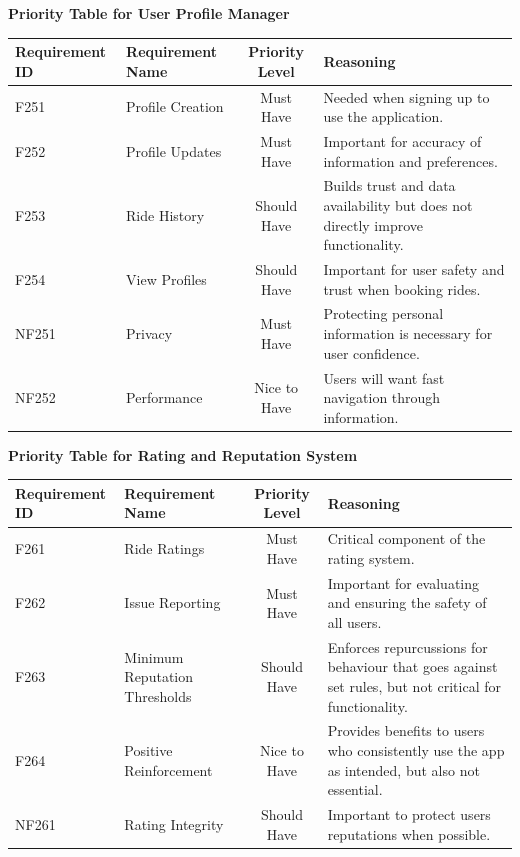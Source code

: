 \documentclass[12pt,letterpaper]{article}
\begin{document}
  \noindent \textbf{Priority Table for User Profile Manager}
  \vspace{0.5em}
  \begin{center}
  \small
  \begin{tabularx}{\textwidth}{|l|X|c|Y|}
  \hline
  \textbf{Requirement ID} & \textbf{Requirement Name} & \textbf{Priority Level} & \textbf{Reasoning} \\ \hline
  F251 & Profile Creation & Must Have & Needed when signing up to use the application. \\ \hline
  F252 & Profile Updates & Must Have & Important for accuracy of information and preferences. \\ \hline
  F253 & Ride History & Should Have & Builds trust and data availability but does not directly improve functionality. \\ \hline
  F254 & View Profiles & Should Have & Important for user safety and trust when booking rides. \\ \hline
  NF251 & Privacy & Must Have & Protecting personal information is necessary for user confidence. \\ \hline
  NF252 & Performance & Nice to Have & Users will want fast navigation through information. \\ \hline
  \end{tabularx}
\end{center}
  \vspace{2em}

  \noindent \textbf{Priority Table for Rating and Reputation System}
  \vspace{0.5em}
  \begin{center}
  \small
  \begin{tabularx}{\textwidth}{|l|X|c|Y|}
  \hline
  \textbf{Requirement ID} & \textbf{Requirement Name} & \textbf{Priority Level} & \textbf{Reasoning} \\ \hline
  F261 & Ride Ratings & Must Have & Critical component of the rating system. \\ \hline
  F262 & Issue Reporting & Must Have & Important for evaluating and ensuring the safety of all users. \\ \hline
  F263 & Minimum Reputation Thresholds & Should Have & Enforces repurcussions for behaviour that goes against set rules, but not critical for functionality. \\ \hline
  F264 & Positive Reinforcement & Nice to Have & Provides benefits to users who consistently use the app as intended, but also not essential. \\ \hline
  NF261 & Rating Integrity & Should Have & Important to protect users reputations when possible. \\ \hline
  \end{tabularx}
\end{center}
\vspace{2em}
\end{document}
